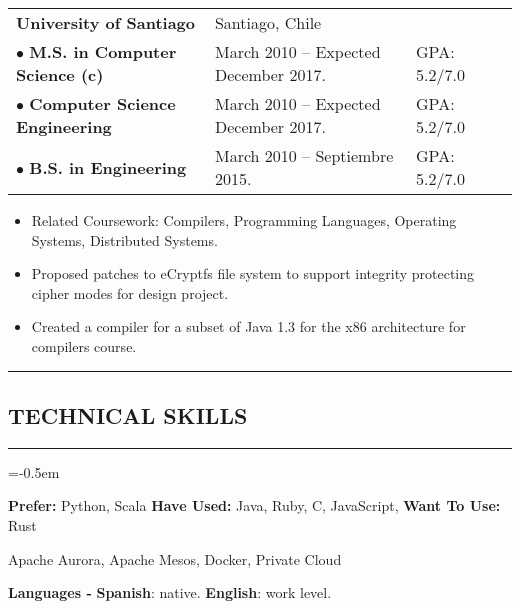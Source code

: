 \documentclass[10pt,letterpaper]{article}
\newcommand{\CPP}
{C\nolinebreak[4]\hspace{-.05em}\raisebox{.22ex}{\footnotesize\bf ++}}
\newcommand{\sectionTitle}[1]{
  \hrule
  \vspace{-1.0em} 
  \subsection*{\uppercase{\textbf{#1}}}
  \vspace{-0.3em}
    \hrule
    \vspace{0.5em}  
}
\begin{document}
  \begin{tabular}{lllc} 
    \textbf{University of Santiago}&Santiago, Chile& & \\
    $\bullet$  \textbf{M.S. in Computer Science (c)}& March 2010 – Expected December 2017. & GPA: 5.2/7.0 & \\
    $\bullet$  \textbf{Computer Science Engineering} & March 2010 – Expected December 2017. & GPA: 5.2/7.0 & \\
    $\bullet$  \textbf{B.S. in Engineering} & March 2010 – Septiembre 2015. & GPA: 5.2/7.0  &\\
  \end{tabular}
  
  \begin{itemize}[label=\textbullet]
    \item Related Coursework: Compilers, Programming Languages, Operating
    Systems, Distributed Systems.
    \item Proposed patches to eCryptfs file system to support
    integrity protecting cipher modes for design project.
    \item Created a compiler for a subset of Java 1.3 for the
    x86 architecture for compilers course.
  \end{itemize}
  
  \sectionTitle{Technical Skills}
  
  \begin{description}[labelindent=\parindent]
    \parskip=-0.5em
    \item[Languages:] \textbf{Prefer:} Python, Scala \textbf{Have Used:} Java, Ruby, \CPP, JavaScript, \textbf{Want To Use:} Rust
    \item[Systems:] Apache Aurora, Apache Mesos, Docker, Private Cloud
  \end{description}
  
  \vspace{-1.0em}
  
  \begin{center}
    \textbf{Languages - } \textbf{Spanish}: native. \textbf{English}: work level.
  \end{center}
  
\end{document}
